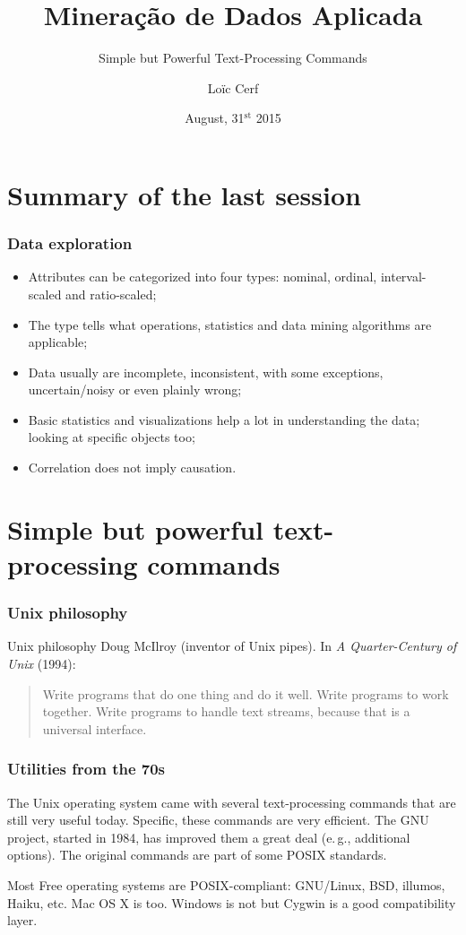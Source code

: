 \documentclass{beamer}
\title{Mineração de Dados Aplicada}
\subtitle{Simple but Powerful Text-Processing Commands}
\author{Loïc Cerf}
\date{August, 31$^{\text{st}}$ 2015}
\institute
{
  \scriptsize
  DCC -- ICEx -- UFMG
  \bigskip\\
  \texttt{[image: images/dcc]}\hfill\texttt{[image: images/ufmg]}
}
\newcommand{\eg}{e.\,g.}
\begin{document}
\begin{frame}[plain]
  \titlepage
\end{frame}

\section*{Summary of the last session}

\begin{frame}
  \frametitle{Data exploration}
  \begin{itemize}
  \item Attributes can be categorized into four types: nominal,
    ordinal, interval-scaled and ratio-scaled;
  \item The type tells what operations, statistics and data mining
    algorithms are applicable;
  \item Data usually are incomplete, inconsistent, with some
    exceptions, uncertain/noisy or even plainly wrong;
  \item Basic statistics and visualizations help a lot in
    understanding the data; looking at specific objects too;
  \item Correlation does not imply causation.
  \end{itemize}
\end{frame}

\section*{Simple but powerful text-processing commands}

\begin{frame}
  \frametitle{Unix philosophy}
  \begin{block}{Unix philosophy}
    Doug McIlroy (inventor of Unix pipes). In \emph{A Quarter-Century
      of Unix} (1994):\\
    \begin{quotation}
      Write programs that do one thing and do it well. Write programs
      to work together. Write programs to handle text streams, because
      that is a universal interface.
    \end{quotation}
  \end{block}
\end{frame}

\begin{frame}
  \frametitle{Utilities from the 70s}
  The Unix operating system came with several text-processing commands
  that are still very useful today. Specific, these commands are very
  efficient. The GNU project, started in 1984, has improved them a
  great deal (\eg, additional options). The original commands are part
  of some POSIX standards.

  \vfill
  \pause

  Most Free operating systems are POSIX-compliant: GNU/Linux, BSD,
  illumos, Haiku, etc. Mac OS X is too. Windows is not but Cygwin is a
  good compatibility layer.
\end{frame}
\end{document}
